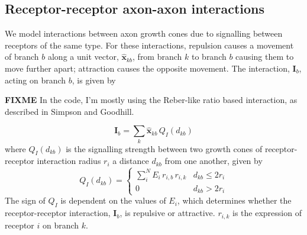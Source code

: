 \subsection*{Receptor-receptor axon-axon interactions}

We model interactions between axon growth cones due to signalling between
receptors of the same type. For these interactions, repulsion causes a
movement of branch $b$ along a unit vector, $\hat{\mathbf{x}}_{kb}$, from
branch $k$ to branch $b$ causing them to move further apart; attraction causes
the opposite movement. The interaction, $\mathbf{I}_b$, acting on branch $b$,
is given by

\textbf{FIXME} In the code, I'm mostly using the Reber-like ratio based
interaction, as described in Simpson and Goodhill.

%
\begin{equation}
\mathbf{I}_b = \sum_k \hat{\mathbf{x}}_{kb}\,Q_I(d_{kb})
\end{equation}
%
where $Q_I(d_{kb})$ is the signalling strength between two growth cones of
receptor-receptor interaction radius $r_i$ a distance $d_{kb}$ from one
another, given by
%
\begin{equation}
Q_I(d_{kb}) = \begin{cases}
     \sum_i^N E_i\,r_{i,b}\,r_{i,k}    & d_{kb} \leq 2r_i \\
     0 & d_{kb} > 2r_i
     \end{cases}
\end{equation}
%
The sign of $Q_I$ is dependent on the values of $E_i$, which determines
whether the receptor-receptor interaction, $\mathbf{I}_b$, is repulsive or
attractive. $r_{i,k}$ is the expression of receptor $i$ on branch $k$.

